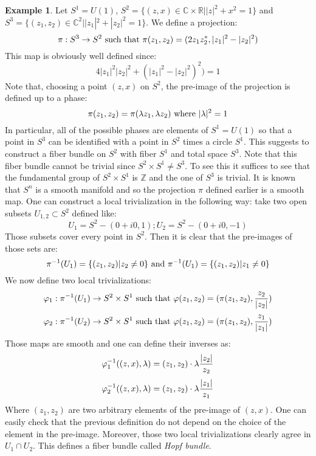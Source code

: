 \documentclass[12pt,a4paper]{report}
\theoremstyle{definition}
\theoremstyle{Theorem}
\theoremstyle{definition}
\newtheorem{Ex}[Def]{Example}
\theoremstyle{definition}
\begin{document}
	\begin{Ex}\label{Ex_3.1.3}
		Let $S^1=U(1)$, $S^2=\{(z,x)\in\mathbb{C}\times\mathbb{R}||z|^2+x^2=1\}$ and $S^3=\{(z_1,z_2)\in\mathbb{C}^2||z_1|^2+|z_2|^2=1\}$. We define a projection:
		$$\pi:S^3\rightarrow S^2\hbox{ such that }\pi(z_1,z_2)=(2z_1z_2^*,|z_1|^2-|z_2|^2)$$
		This map is obviously well defined since:
		$$4|z_1|^2|z_2|^2+(|z_1|^2-|z_2|^2)^2)=1$$
		Note that, choosing a point $(z,x)$ on $S^2$, the pre-image of the projection is defined up to a phase:
		$$\pi(z_1,z_2)=\pi(\lambda z_1,\lambda z_2)\hbox{ where }|\lambda|^2=1$$
		In particular, all of the possible phases are elements of $S^1=U(1)$ so that a point in $S^3$ can be identified with a point in $S^2$ times a circle $S^1$. This suggests to construct a fiber bundle on $S^2$ with fiber $S^1$ and total space $S^3$. Note that this fiber bundle cannot be trivial since $S^2\times S^1\neq S^3$. To see this it suffices to see that the fundamental group of $S^2\times S^1$ is $\mathbb{Z}$ and the one of $S^3$ is trivial.
		It is known that $S^n$ is a smooth manifold and so the projection $\pi$ defined earlier is a smooth map. One can construct a local trivialization in the following way: take two open subsets $U_{1,2}\subset S^2$ defined like:
		$$U_1=S^2-(0+i0,1);U_2=S^2-(0+i0,-1)$$
		Those subsets cover every point in $S^2$. Then it is clear that the pre-images of those sets are:
		$$\pi^{-1}(U_1)=\{(z_1,z_2)|z_2\neq 0\}\hbox{ and }\pi^{-1}(U_1)=\{(z_1,z_2)|z_1\neq 0\}$$
		We now define two local trivializations:
		$$\varphi_1:\pi^{-1}(U_1)\rightarrow S^2\times S^1\hbox{ such that }\varphi(z_1,z_2)=(\pi(z_1,z_2),{z_2\over |z_2|})$$
		$$\varphi_2:\pi^{-1}(U_2)\rightarrow S^2\times S^1\hbox{ such that }\varphi(z_1,z_2)=(\pi(z_1,z_2),{z_1\over |z_1|})$$
		Those maps are smooth and one can define their inverses as:
		$$\varphi_1^{-1}((z,x),\lambda)=(z_1,z_2)\cdot\lambda{|z_2|\over z_2}$$
		$$\varphi_2^{-1}((z,x),\lambda)=(z_1,z_2)\cdot\lambda{|z_1|\over z_1}$$
		Where $(z_1,z_2)$ are two arbitrary elements of the pre-image of $(z,x)$. One can easily check that the previous definition do not depend on the choice of the element in the pre-image. Moreover, those two local trivializations clearly agree in $U_1\cap U_2$. This defines a fiber bundle called \textit{Hopf bundle}.
	\end{Ex}
\end{document}
